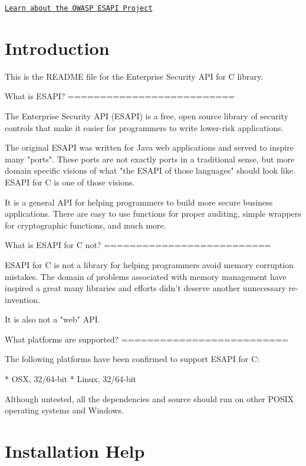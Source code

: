 \href{http://www.owasp.org/index.php/Category:OWASP_Enterprise_Security_API}{\tt Learn about the OWASP ESAPI Project} \hypertarget{main_intro}{}\section{Introduction}\label{main_intro}

\begin{DoxyVerbInclude}
This is the README file for the Enterprise Security API for C library.

What is ESAPI?
==========================

The Enterprise Security API (ESAPI) is a free, open source library of
security controls that make it easier for programmers to write lower-risk
applications.

The original ESAPI was written for Java web applications and served to 
inspire many "ports". These ports are not exactly ports in a traditional
sense, but more domain specific visions of what "the ESAPI of those 
languages" should look like. ESAPI for C is one of those visions.

It is a general API for helping programmers to build more secure business 
applications. There are easy to use functions for proper auditing, simple
wrappers for cryptographic functions, and much more.

What is ESAPI for C not?
==========================

ESAPI for C is not a library for helping programmers avoid memory
corruption mistakes. The domain of problems associated with memory 
management have inspired a great many libraries and efforts didn't 
deserve another unnecessary re-invention.

It is also not a "web" API.

What platforms are supported?
==========================

The following platforms have been confirmed to support ESAPI for C:

* OSX, 32/64-bit
* Linux, 32/64-bit

Although untested, all the dependencies and source should run on other 
POSIX operating systems and Windows.
\end{DoxyVerbInclude}
\hypertarget{main_notes}{}\section{Installation Help}\label{main_notes}


